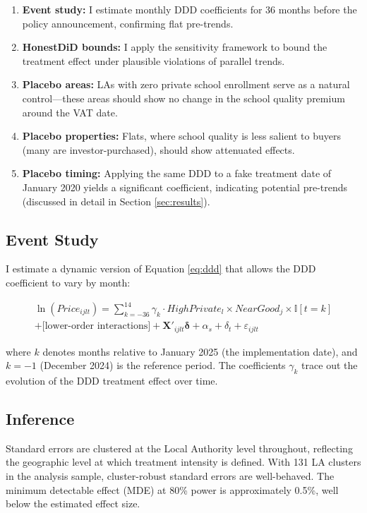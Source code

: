 \documentclass[12pt]{article}
\newcommand{\ind}{\mathbb{I}}
\begin{document}
\begin{enumerate}
    \item \textbf{Event study:} I estimate monthly DDD coefficients for 36 months before the policy announcement, confirming flat pre-trends.
    \item \textbf{HonestDiD bounds:} I apply the \citet{rambachan2023} sensitivity framework to bound the treatment effect under plausible violations of parallel trends.
    \item \textbf{Placebo areas:} LAs with zero private school enrollment serve as a natural control---these areas should show no change in the school quality premium around the VAT date.
    \item \textbf{Placebo properties:} Flats, where school quality is less salient to buyers (many are investor-purchased), should show attenuated effects.
    \item \textbf{Placebo timing:} Applying the same DDD to a fake treatment date of January 2020 yields a significant coefficient, indicating potential pre-trends (discussed in detail in Section \ref{sec:results}).
\end{enumerate}

\subsection{Event Study}

I estimate a dynamic version of Equation \ref{eq:ddd} that allows the DDD coefficient to vary by month:

\begin{multline}\label{eq:event}
    \ln(Price_{ijlt}) = \sum_{k=-36}^{14} \gamma_k \cdot HighPrivate_l \times NearGood_j \times \ind[t = k] \\
    + \text{[lower-order interactions]} + \mathbf{X}'_{ijlt}\boldsymbol{\delta} + \alpha_s + \delta_t + \varepsilon_{ijlt}
\end{multline}

\noindent where $k$ denotes months relative to January 2025 (the implementation date), and $k = -1$ (December 2024) is the reference period. The coefficients $\gamma_k$ trace out the evolution of the DDD treatment effect over time.

\subsection{Inference}

Standard errors are clustered at the Local Authority level throughout, reflecting the geographic level at which treatment intensity is defined. With 131 LA clusters in the analysis sample, cluster-robust standard errors are well-behaved. The minimum detectable effect (MDE) at 80\% power is approximately 0.5\%, well below the estimated effect size.
\end{document}
